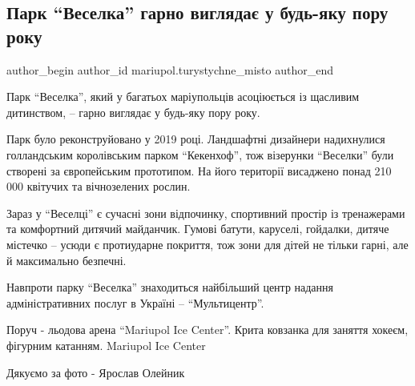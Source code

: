 
 
 
 
 

\subsection{Парк \enquote{Веселка} гарно виглядає у будь-яку пору року}
\label{sec:26_11_2021.fb.mariupol.turystychne_misto.1.park_veselka}

\ifcmt
 author_begin
   author_id mariupol.turystychne_misto
 author_end
\fi

Парк \enquote{Веселка}, який у багатьох маріупольців асоціюється із щасливим
дитинством, –  гарно виглядає у будь-яку пору року.

Парк було реконструйовано у 2019 році. Ландшафтні дизайнери надихнулися
голландським королівським парком \enquote{Кекенхоф}, тож візерунки
\enquote{Веселки} були створені за європейським прототипом.  На його території
висаджено понад 210 000 квітучих та вічнозелених рослин. 

Зараз у \enquote{Веселці} є сучасні зони відпочинку, спортивний простір із
тренажерами та комфортний дитячий майданчик. Гумові батути, каруселі, гойдалки,
дитяче містечко – усюди є протиударне покриття, тож зони для дітей не тільки
гарні, але й максимально безпечні. 

Навпроти парку \enquote{Веселка} знаходиться найбільший центр надання
адміністративних послуг в Україні – \enquote{Мультицентр}.

Поруч - льодова арена \enquote{Mariupol Ice Center}. Крита ковзанка для заняття хокеєм,
фігурним катанням. Mariupol Ice Center 

Дякуємо за фото - Ярослав Олейник
